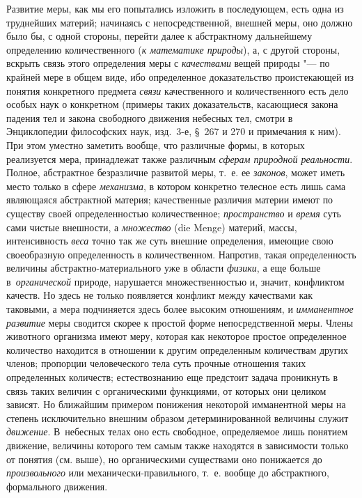 Развитие меры, как мы его попытались изложить в последующем, есть одна из
труднейших материй; начинаясь с непосредственной, внешней меры, оно должно было
бы, с одной стороны, перейти далее к абстрактному дальнейшему определению
количественного ({\em к математике природы}), а, с другой стороны, вскрыть
связь этого определения меры с {\em качествами} вещей природы "--- по крайней
мере в общем виде, ибо определенное доказательство проистекающей из понятия
конкретного предмета {\em связи} качественного и количественного есть дело
особых наук о конкретном (примеры таких доказательств, касающиеся закона
падения тел и закона свободного движения небесных тел, смотри в Энциклопедии
философских наук, изд.~3-е, \S~267 и 270 и примечания к ним). При этом уместно
заметить вообще, что различные формы, в которых реализуется мера, принадлежат
также различным {\em сферам природной реальности}. Полное, абстрактное
безразличие развитой меры, т.~е. ее {\em законов}, может иметь место только в
сфере {\em механизма}, в котором конкретно телесное есть лишь сама являющаяся
абстрактной материя; качественные различия материи имеют по существу своей
определенностью количественное; {\em пространство} и {\em время} суть сами
чистые внешности, а {\em множество} (die Menge) материй, массы, интенсивность
{\em веса} точно так же суть внешние определения, имеющие свою своеобразную
определенность в количественном. Напротив, такая определенность величины
абстрактно-материального уже в области {\em физики}, а еще больше
в~{\em органической} природе, нарушается множественностью и, значит, конфликтом
качеств. Но здесь не только появляется конфликт между качествами как таковыми,
а мера подчиняется здесь более высоким отношениям, и {\em имманентное развитие}
меры сводится скорее к простой форме непосредственной меры. Члены животного
организма имеют меру, которая как некоторое простое определенное количество
находится в отношении к другим определенным количествам других членов;
пропорции человеческого тела суть прочные отношения таких определенных
количеств; естествознанию еще предстоит задача проникнуть в связь таких величин
с органическими функциями, от которых они целиком зависят. Но ближайшим
примером понижения некоторой имманентной меры на степень исключительно внешним
образом детерминированной величины служит {\em движение}. В~небесных телах оно
есть свободное, определяемое лишь понятием движение, величины которого тем
самым также находятся в зависимости только от понятия (см. выше), но
органическими существами оно понижается до {\em произвольного} или
механически-правильного, т.~е. вообще до абстрактного, формального движения.

